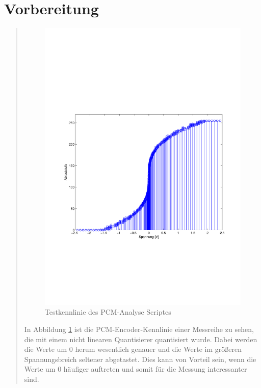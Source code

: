 \section{Vorbereitung}
\begin{quote}
    
    
    \begin{figure}[H]
        \centering
        \includegraphics[scale=0.7, trim = 2cm 7cm 1cm 8cm, clip]{Bilder/PCM_Test}
        \caption{Testkennlinie des PCM-Analyse Scriptes}
        \label{fig:PCM_Test}
    \end{figure}
    
    \vspace{2em}
    
    In Abbildung \ref{fig:PCM_Test} ist die PCM-Encoder-Kennlinie einer Messreihe zu sehen, die mit einem nicht
    linearen Quantisierer quantisiert wurde. Dabei werden die Werte um 0 herum wesentlich genauer und die
    Werte im größeren Spannungsbreich seltener abgetastet. Dies kann von Vorteil sein, wenn die Werte um 0 häufiger
    auftreten und somit für die Messung interessanter sind.\\
    
    
    
    
    
    
    
    
\end{quote}


